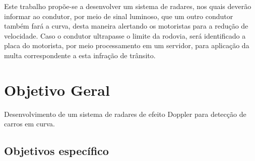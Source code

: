 Este trabalho propõe-se a desenvolver um sistema de radares, nos quais deverão informar ao condutor, por meio de sinal luminoso, que um outro condutor também fará a curva, desta maneira alertando os motoristas para a redução de velocidade. Caso o condutor ultrapasse o limite da rodovia, será identificado a placa do motorista, por meio processamento em um servidor, para aplicação da multa correspondente a esta infração de trânsito.


\section{Objetivo Geral}

Desenvolvimento de um sistema de radares de efeito Doppler para detecção de carros em curva.


\subsection{Objetivos específico}